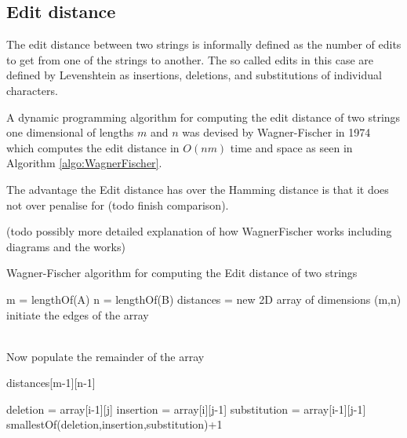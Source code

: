 \documentclass[12pt,twoside,notitlepage]{report}
\begin{document}
		
 		\subsection{Edit distance}
		The edit distance between two strings is informally defined as the number of edits to get from one of the strings to another. The so called edits in this case are defined by Levenshtein\cite{Levenshtein1966} as insertions, deletions, and substitutions of individual characters. 
		
		A dynamic programming algorithm for computing the edit distance of two strings one dimensional of lengths $m$ and $n$ was devised by Wagner-Fischer in 1974\cite{WagnerFischer1974} which computes the edit distance in $O(nm)$ time and space as seen in Algorithm \ref{algo:WagnerFischer}. 
		
		The advantage the Edit distance has over the Hamming distance is that it does not over penalise for (todo finish comparison).
		
		(todo possibly more detailed explanation of how WagnerFischer works including diagrams and the works)
		
		\begin{algorithm}
				\caption{Wagner-Fischer algorithm for computing the Edit distance of two strings}
				\label{algo:WagnerFischer}
				\begin{algorithmic}[1]
						\State m = lengthOf(A)
						\State n = lengthOf(B)
						\State distances = new 2D array of dimensions (m,n)		
						\State \\initiate the edges of the array
							
						\EndFor
						\EndFor
						
						\State \\Now populate the remainder of the array
								\Else
									
								\EndIf
							\EndFor
						\EndFor
						
						\State \Return distances[m-1][n-1]


					\EndProcedure
						\State deletion = array[i-1][j]
						\State insertion = array[i][j-1]
						\State substitution = array[i-1][j-1]
						\State \Return smallestOf(deletion,insertion,substitution)+1
					\EndProcedure
				\end{algorithmic}
				\end{algorithm}
		
\end{document}
